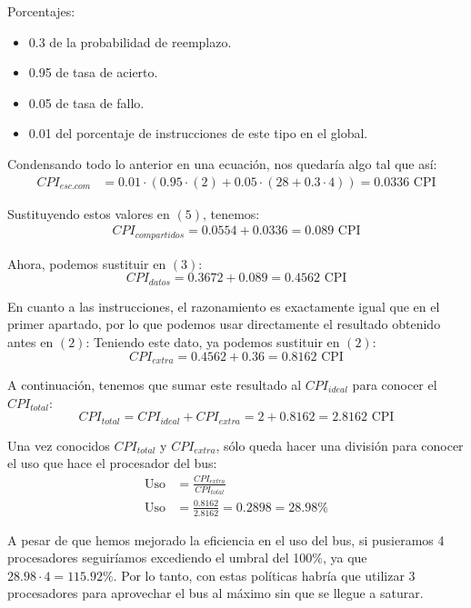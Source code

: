 \documentclass[12pt,a4paper]{article}
\begin{document}
Porcentajes:
\begin{itemize}
\item 0.3 de la probabilidad de reemplazo.
\item 0.95 de tasa de acierto.
\item 0.05 de tasa de fallo.
\item 0.01 del porcentaje de instrucciones de este tipo en el global.
\end{itemize}

Condensando todo lo anterior en una ecuación, nos quedaría algo tal que así:
\begin{align*}
CPI_{esc.com}&=0.01\cdot (0.95\cdot (2) + 0.05\cdot (28+0.3\cdot 4))=0.0336\text{ CPI}
\end{align*}

Sustituyendo estos valores en $(5)$, tenemos:
\begin{align*}
CPI_{compartidos}=0.0554+0.0336=0.089 \text{ CPI}
\end{align*}

Ahora, podemos sustituir en $(3)$:
\begin{equation*}
CPI_{datos}=0.3672+0.089=0.4562\text{ CPI}
\end{equation*}

En cuanto a las instrucciones, el razonamiento es exactamente igual que en el primer apartado, por lo que podemos usar directamente el resultado obtenido antes en $(2)$:
Teniendo este dato, ya podemos sustituir en $(2)$:
\begin{equation*}
CPI_{extra}=0.4562+0.36=0.8162\text{ CPI}
\end{equation*}

A continuación, tenemos que sumar este resultado al $CPI_{ideal}$ para conocer el $CPI_{total}$:
\begin{equation*}
CPI_{total}=CPI_{ideal}+CPI_{extra}=2+0.8162=2.8162\text{ CPI}
\end{equation*}

Una vez conocidos $CPI_{total}$ y $CPI_{extra}$, sólo queda hacer una división para conocer el uso que hace el procesador del bus:
\begin{align*}
\text{Uso}&=\frac{CPI_{extra}}{CPI_{total}}\\
\text{Uso}&=\frac{0.8162}{2.8162} = 0.2898 = 28.98\%
\end{align*}

A pesar de que hemos mejorado la eficiencia en el uso del bus, si pusieramos 4 procesadores seguiríamos excediendo el umbral del 100\%, ya que $28.98\cdot 4=115.92\%$. Por lo tanto, con estas políticas habría que utilizar 3 procesadores para aprovechar el bus al máximo sin que se llegue a saturar.
\end{document}
